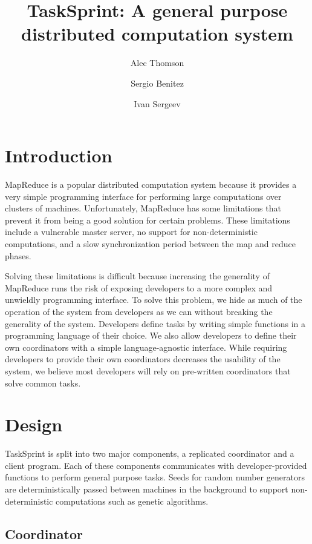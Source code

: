 \documentclass [11pt, twocolumn] {article}
\begin{document}
 

\title { TaskSprint: A general purpose distributed computation system }
\author{ Alec Thomson \and Sergio Benitez \and Ivan Sergeev }
\date {}

\maketitle


\section {Introduction} 

MapReduce is a popular distributed computation system because it provides a very simple programming interface for performing large computations over clusters of machines. Unfortunately, MapReduce has some limitations that prevent it from being a good solution for certain problems. These limitations include a vulnerable master server, no support for non-deterministic computations, and a slow synchronization period between the map and reduce phases. 

Solving these limitations is difficult because increasing the generality of MapReduce runs the risk of exposing developers to a more complex and unwieldly programming interface. To solve this problem, we hide as much of the operation of the system from developers as we can without breaking the generality of the system. Developers define tasks by writing simple functions in a programming language of their choice. We also allow developers to define their own coordinators with a simple language-agnostic interface. While requiring developers to provide their own coordinators decreases the usability of the system, we believe most developers will rely on pre-written coordinators that solve common tasks. 

\section {Design}

TaskSprint is split into two major components, a replicated coordinator and a client program. Each of these components communicates with developer-provided functions to perform general purpose tasks. Seeds for random number generators are deterministically passed between machines in the background to support non-deterministic computations such as genetic algorithms. 

\subsection {Coordinator} 
\end{document}
